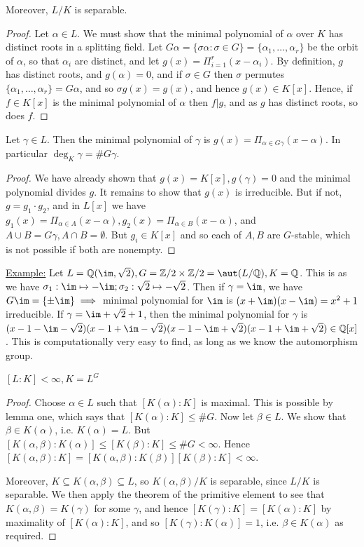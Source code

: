 \documentclass[a4paper, 10pt, twocolumn]{amsart}
\begin{document}
\begin{lemma}
Moreover, $L/K$ is separable.
\end{lemma}
\begin{proof}
Let $\alpha \in L$. We must show that the minimal polynomial of $\alpha$ over $K$ has distinct roots in a splitting field. Let $G\alpha = \{\sigma\alpha : \sigma \in G\} = \{\alpha_1, \ldots, \alpha_r\}$ be the orbit of $\alpha$, so that $\alpha_i$ are distinct, and let $g(x) = \Pi_{i=1}^r (x-\alpha_i).$ By definition, $g$ has distinct roots, and $g(\alpha) = 0$, and if $\sigma \in G$ then $\sigma$ permutes $\{\alpha_1, \ldots, \alpha_r\} = G\alpha$, and so $\sigma g(x) = g(x)$, and hence $g(x) \in K[x]$. Hence, if $f \in K[x]$ is the minimal polynomial of $\alpha$ then $f|g$, and as $g$ has distinct roots, so does $f$.
\end{proof}
\begin{lemma}
Let $\gamma \in L$. Then the minimal polynomial of $\gamma$ is $g(x) = \Pi_{\alpha \in G\gamma} (x-\alpha)$. In particular $\deg_K \gamma = \# G\gamma$.
\end{lemma}
\begin{proof}
We have already shown that $g(x) = K[x], g(\gamma) = 0$ and the minimal polynomial divides $g$. It remains to show that $g(x)$ is irreducible. But if not, $g = g_1 \cdot g_2$, and in $L[x]$ we have $g_1(x) = \Pi_{\alpha \in A} (x-\alpha), g_2(x) = \Pi_{\alpha\in B} (x-\alpha)$, and $A \cup B = G\gamma, A \cap B = \emptyset$. But $g_i \in K[x]$ and so each of $A, B$ are $G$-stable, which is not possible if both are nonempty.
\end{proof}
\underline{Example:} Let $L = \mathbb{Q}(\im, \sqrt{2}), G = \mathbb{Z}/2 \times \mathbb{Z}/2 = \aut (L/\mathbb{Q}), K = \mathbb{Q}$. This is as we have $\sigma_1: \im \mapsto -\im; \sigma_2: \sqrt{2} \mapsto -\sqrt{2}$. Then if $\gamma= \im$, we have $G \im = \{\pm \im\} \implies$ minimal polynomial for $\im$ is $(x+\im)(x-\im) = x^2+1$ irreducible. If $\gamma = \im + \sqrt{2} + 1$, then the minimal polynomial for $\gamma$ is $(x-1-\im-\sqrt{2})(x-1+\im-\sqrt{2})(x-1-\im+\sqrt{2})(x-1+\im+\sqrt{2}) \in \mathbb{Q}[x]$. This is computationally very easy to find, as long as we know the automorphism group.
\begin{lemma}
$[L:K] <\infty, K = L^G$
\end{lemma}
\begin{proof}
Choose $\alpha \in L$ such that $[K(\alpha):K]$ is maximal. This is possible by lemma one, which says that $[K(\alpha):K] \leq \#G$. Now let $\beta \in L$. We show that $\beta \in K(\alpha)$, i.e. $K(\alpha) = L$. But $[K(\alpha,\beta):K(\alpha)] \leq [K(\beta):K] \leq \#G <\infty$. Hence $[K(\alpha,\beta):K] = [K(\alpha,\beta):K(\beta)][K(\beta):K] <\infty$.

Moreover, $K \subseteq K(\alpha,\beta) \subseteq L$, so $K(\alpha, \beta)/K$ is separable, since $L/K$ is separable. We then apply the theorem of the primitive element to see that $K(\alpha, \beta) = K(\gamma)$ for some $\gamma$, and hence $[K(\gamma):K] = [K(\alpha):K]$ by maximality of $[K(\alpha):K]$, and so $[K(\gamma):K(\alpha)] = 1$, i.e. $\beta \in K(\alpha)$ as required.
\end{proof}
\end{document}
